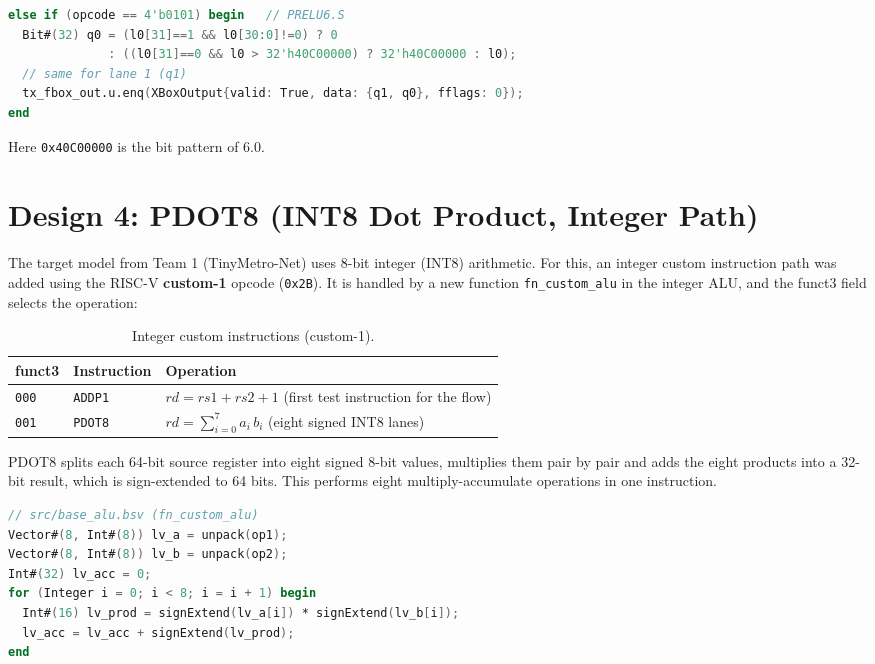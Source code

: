 \begin{lstlisting}[language=Verilog,basicstyle=\ttfamily\small]
else if (opcode == 4'b0101) begin   // PRELU6.S
  Bit#(32) q0 = (l0[31]==1 && l0[30:0]!=0) ? 0
              : ((l0[31]==0 && l0 > 32'h40C00000) ? 32'h40C00000 : l0);
  // same for lane 1 (q1)
  tx_fbox_out.u.enq(XBoxOutput{valid: True, data: {q1, q0}, fflags: 0});
end
\end{lstlisting}

Here \texttt{0x40C00000} is the bit pattern of 6.0.

\section{Design 4: PDOT8 (INT8 Dot Product, Integer Path)}

The target model from Team 1 (TinyMetro-Net) uses 8-bit integer (INT8)
arithmetic. For this, an integer custom instruction path was added using the
RISC-V \textbf{custom-1} opcode (\texttt{0x2B}). It is handled by a new
function \texttt{fn\_custom\_alu} in the integer ALU, and the funct3 field
selects the operation:

\begin{table}[h]
\centering
\begin{tabular}{lll}\toprule
funct3 & Instruction & Operation\\\midrule
\texttt{000} & \texttt{ADDP1} & $rd = rs1 + rs2 + 1$ (first test instruction for the flow)\\
\texttt{001} & \texttt{PDOT8} & $rd = \sum_{i=0}^{7} a_i \, b_i$ (eight signed INT8 lanes)\\\bottomrule
\end{tabular}
\caption{Integer custom instructions (custom-1).}
\end{table}

PDOT8 splits each 64-bit source register into eight signed 8-bit values,
multiplies them pair by pair and adds the eight products into a 32-bit
result, which is sign-extended to 64 bits. This performs eight
multiply-accumulate operations in one instruction.

\begin{lstlisting}[language=Verilog,basicstyle=\ttfamily\small]
// src/base_alu.bsv (fn_custom_alu)
Vector#(8, Int#(8)) lv_a = unpack(op1);
Vector#(8, Int#(8)) lv_b = unpack(op2);
Int#(32) lv_acc = 0;
for (Integer i = 0; i < 8; i = i + 1) begin
  Int#(16) lv_prod = signExtend(lv_a[i]) * signExtend(lv_b[i]);
  lv_acc = lv_acc + signExtend(lv_prod);
end
\end{lstlisting}

